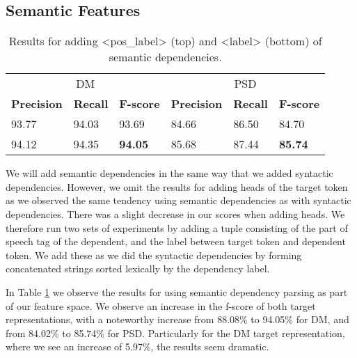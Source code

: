 

\subsection{Semantic Features}
\label{results_sem}



\begin{table}
    \centering
    \smaller[0.2]
    \begin{tabular}{@{}llllll@{}}
        \toprule
        \multicolumn{3}{c}{DM}
        & \multicolumn{3}{c}{PSD} \\
        \textbf{Precision} & \textbf{Recall} & \textbf{F-score} & \textbf{Precision} & \textbf{Recall} & \textbf{F-score} \\
        93.77 & 94.03 & 93.69 & 84.66 & 86.50 & 84.70 \\
        94.12 & 94.35 & \textbf{94.05} & 85.68 & 87.44 & \textbf{85.74} \\
        \bottomrule
    \end{tabular}
    \caption{Results for adding <pos\_label> (top) and <label> (bottom) of semantic dependencies.}
    \label{table:semantic_dependents_n}
\end{table}



We will add semantic dependencies in the same way that we added syntactic dependencies. However, we omit the results for adding heads of the target token as we observed the same tendency using semantic dependencies as with syntactic dependencies. There was a slight decrease in our scores when adding heads. We therefore run two sets of experiments by adding a tuple consisting of the part of speech tag of the dependent, and the label between target token and dependent token. We add these as we did the syntactic dependencies by forming concatenated strings sorted lexically by the dependency label.

In Table \ref{table:semantic_dependents_n} we observe the results for using semantic dependency parsing as part of our feature space. We observe an increase in the f-score of both target representations, with a noteworthy increase from 88.08\% to 94.05\% for DM, and from 84.02\% to 85.74\% for PSD. Particularly for the DM target representation, where we see an increase of 5.97\%, the results seem dramatic.

